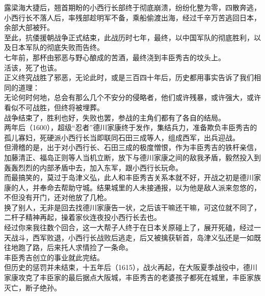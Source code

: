 \begin{multicols}{\theparacolNo}
露梁海大捷后，翘首期盼的小西行长部终于彻底崩溃，纷纷化整为零，四散奔逃，小西行长不落人后，率残部趁明军不备，乘船偷渡出海，经过千辛万苦逃回日本，余部大部被歼。\\

至此，抗倭援朝战争正式结束，此战历时七年，最终，以中国军队的彻底胜利，以及日本军队的彻底失败而告终。\\

七年前，那杯由邪恶与野心酿成的苦酒，最终浇到丰臣秀吉的坟头上。\\

活该，死了也该。\\

正义终究战胜了邪恶，无论此时，或是三百四十年后，历史都用事实告诉了我们相同的道理：\\

无论何时何地，总会有那么几个不安分的侵略者，他们或许残暴，或许强大，或许看似不可战胜，但终将被埋葬。\\

战争结束了，胜利也好，失败也罢，参战的主角们都有了各自的结局。\\

两年后（1600），超级“忍者”德川家康终于发作，集结兵力，准备欺负丰臣秀吉的孤儿寡妇，死硬派小西行长当即联同石田三成等人，组成西军，出兵迎战。\\

但滑稽的是，出于对小西行长、石田三成的极度憎恨，作为丰臣秀吉的铁杆亲信，加藤清正、福岛正则等人当机立断，放下与德川家康之间的敌我矛盾，毅然投入到轰轰烈烈的内部矛盾中去，加入东军，跟小西行长玩命。\\

而最搞笑的，莫过于岛津义弘，此人和丰臣秀吉关系本就不好，开战之初是德川家康的人，并奉命去帮助守城。结果城里的人未接通报，以为他是敌人派来忽悠的，不但没有开门，还对他放了几枪。\\

换了别人，无非是回去找德川家康告一状，之后该干嘛还干嘛，可这位就不同了，二杆子精神再起，操着家伙连夜投小西行长去也。\\

经过你来我往数个回合，这一大帮子人终于在日本关原碰上了，展开死磕，经过一天战斗，西军败退，小西行长战败后逃走，后又被擒获斩首，岛津义弘还是一如既往地跑了路，后来托人求情捡了一条命。\\

丰臣秀吉创立的事业就此完结。\\

但历史的惩罚并未结束，十五年后（1615），战火再起，在大阪夏季战役中，德川家康攻克了丰臣家的最后据点大阪城，丰臣秀吉的老婆孩子都死在城里，丰臣家族灭亡，断子绝孙。\\


\end{multicols}
